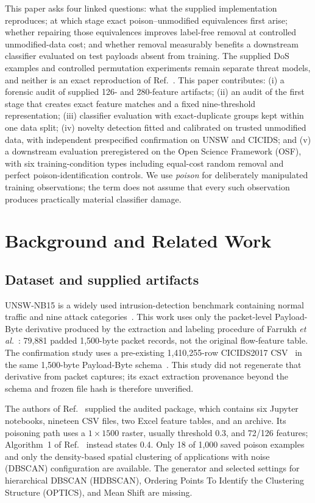 \documentclass[conference]{IEEEtran}
\begin{document}
This paper asks four linked questions: what the supplied implementation
reproduces; at which stage exact poison--unmodified equivalences first arise;
whether repairing those equivalences improves label-free removal at controlled
unmodified-data cost; and whether removal measurably benefits a downstream
classifier evaluated on test payloads absent from training. The supplied DoS examples and controlled permutation
experiments remain separate threat models, and neither is an exact reproduction
of Ref.~\cite{monkam2024}. This paper contributes: (i) a forensic audit of supplied
126- and 280-feature artifacts; (ii) an audit of the first stage that creates
exact feature matches and a fixed nine-threshold representation; (iii)
classifier evaluation with exact-duplicate groups kept within one data split;
(iv) novelty detection fitted and calibrated on trusted unmodified data, with
independent prespecified confirmation on UNSW and CICIDS; and (v) a downstream
evaluation preregistered on the Open Science Framework (OSF), with six training-condition types including
equal-cost random removal and perfect poison-identification controls.
We use \emph{poison} for deliberately
manipulated training observations; the term does not assume that every such
observation produces practically material classifier damage.


\section{Background and Related Work}
\subsection{Dataset and supplied artifacts}
UNSW-NB15 is a widely used intrusion-detection benchmark containing normal
traffic and nine attack categories~\cite{moustafa2015}. This work uses only the
packet-level Payload-Byte derivative produced by the extraction and labeling
procedure of Farrukh \emph{et al.}~\cite{farrukh2022}: 79,881 padded
1,500-byte packet records, not the original flow-feature table. The confirmation
study uses a pre-existing 1,410,255-row CICIDS2017 CSV~\cite{sharafaldin2018} in
the same 1,500-byte Payload-Byte schema~\cite{farrukh2022}. This study did not
regenerate that derivative from packet captures; its exact extraction
provenance beyond the schema and frozen file hash is therefore unverified.

The authors of Ref.~\cite{monkam2024} supplied the audited package, which contains six
Jupyter notebooks, nineteen CSV files, two Excel
feature tables, and an archive. Its poisoning path uses a $1\times1500$ raster,
usually threshold 0.3, and 72/126 features; Algorithm~1 of Ref.~\cite{monkam2024}
instead states 0.4.
Only 18 of 1,000 saved poison examples and only the density-based spatial
clustering of applications with noise (DBSCAN) configuration are available.
The generator and selected settings for hierarchical DBSCAN (HDBSCAN), Ordering
Points To Identify the Clustering Structure (OPTICS), and Mean Shift are missing.
\end{document}
